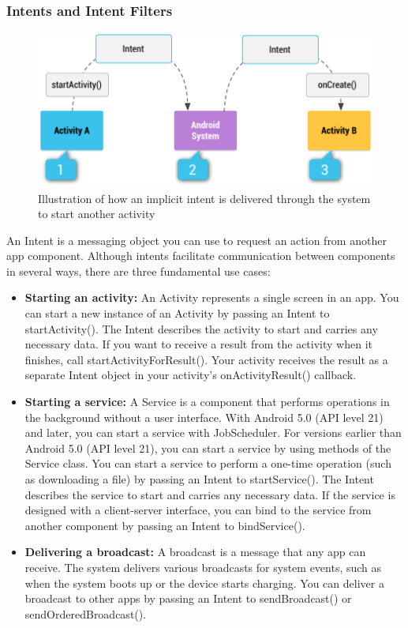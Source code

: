 \documentclass[14pt]{report}
\begin{document}
					\subsubsection{Intents and Intent Filters}
						\begin{figure}[b]
							\includegraphics[width=12cm]{IntentFilters.png}
							\centering
							\caption{Illustration of how an implicit intent is delivered through the system to start another activity}
							\label{fig:IntentFilters}
						\end{figure}
						An Intent is a messaging object you can use to request an action from another app component. Although intents facilitate communication between components in several ways, there are three fundamental use cases:
						\begin{itemize}
							\item \textbf{Starting an activity:} An Activity represents a single screen in an app. You can start a new instance of an Activity by passing an Intent to startActivity(). The Intent describes the activity to start and carries any necessary data. If you want to receive a result from the activity when it finishes, call startActivityForResult(). Your activity receives the result as a separate Intent object in your activity's onActivityResult() callback.
							\item \textbf{Starting a service:} A Service is a component that performs operations in the background without a user interface. With Android 5.0 (API level 21) and later, you can start a service with JobScheduler. For versions earlier than Android 5.0 (API level 21), you can start a service by using methods of the Service class. You can start a service to perform a one-time operation (such as downloading a file) by passing an Intent to startService(). The Intent describes the service to start and carries any necessary data. If the service is designed with a client-server interface, you can bind to the service from another component by passing an Intent to bindService().
							\item \textbf{Delivering a broadcast: } A broadcast is a message that any app can receive. The system delivers various broadcasts for system events, such as when the system boots up or the device starts charging. You can deliver a broadcast to other apps by passing an Intent to sendBroadcast() or sendOrderedBroadcast().
						\end{itemize}
\end{document}
